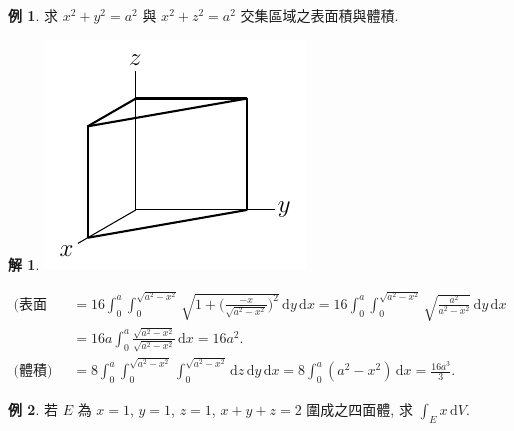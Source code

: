 \documentclass[12pt]{extarticle}
\newcommand{\ds}{\displaystyle}
\theoremstyle{definition}
\newtheorem*{ex}{例}
\newtheorem*{sol}{解}
\begin{document}
\begin{ex}
  求 $x^2 + y^2 = a^2$ 與 $x^2 + z^2 = a^2$ 交集區域之表面積與體積.
\end{ex}

\begin{sol}
  \begin{minipage}{0.2\textwidth}
    \includegraphics[scale=0.9,page=18]{fig/text.pdf} 
  \end{minipage}
  \begin{minipage}{0.8\textwidth}
    \begin{align*}
      \text{(表面積)} &= 16\int_0^a\!\!\int_0^{\sqrt{a^2 - x^2}}\!\!\!\!\sqrt{1 + \Big(\frac{-x}{\sqrt{a^2 - x^2}}\Big)^2}\,\text{d}y\,\text{d}x = 16\int_0^a\!\!\int_0^{\sqrt{a^2 - x^2}}\!\!\!\!\sqrt{\frac{a^2}{a^2 - x^2}}\,\text{d}y\,\text{d}x \\ &= 16 a\int_0^a\!\frac{\sqrt{a^2 - x^2}}{\sqrt{a^2 - x^2}}\,\text{d}x = 16 a^2. \\
      \text{(體積)} &= 8\int_0^a\!\!\int_0^{\sqrt{a^2 - x^2}}\!\!\!\!\int_0^{\sqrt{a^2 - x^2}}\!\!\text{d}z\,\text{d}y\,\text{d}x = 8\int_0^a(a^2 - x^2)\,\text{d}x = \frac{16 a^3}{3}. 
    \end{align*}
  \end{minipage}
\end{sol}

\begin{ex}
  若 $E$ 為 $x = 1$, $y = 1$, $z = 1$, $x + y + z = 2$ 圍成之四面體, 求 $\ds\int_E x\,\text{d}V$.
\end{ex}
\end{document}
